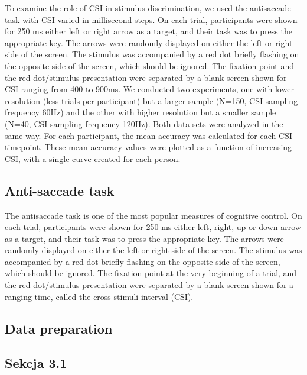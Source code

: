 \documentclass[
  man,draftall]{apa6}
\begin{document}
To examine the role of CSI in stimulus discrimination, we used the antisaccade
task with CSI varied in millisecond steps. On each trial, participants were shown for 250 ms
either left or right arrow as a target, and their task was to press the appropriate
key. The arrows were randomly displayed on either the left or right side of the
screen. The stimulus was accompanied by a red dot briefly flashing on the
opposite side of the screen, which should be ignored. The fixation point and
the red dot/stimulus presentation were separated by a blank screen shown for
CSI ranging from 400 to 900ms. We conducted two experiments, one with lower
resolution (less trials per participant) but a larger sample (N=150, CSI sampling
frequency 60Hz) and the other with higher resolution but a smaller sample
(N=40, CSI sampling frequency 120Hz). Both data sets were analyzed in the
same way. For each participant, the mean accuracy was calculated for each CSI
timepoint. These mean accuracy values were plotted as a function of increasing
CSI, with a single curve created for each person.

\hypertarget{anti-saccade-task}{%
\subsection{Anti-saccade task}\label{anti-saccade-task}}

The antisaccade task is one of the most popular measures of cognitive control.
On each trial, participants were shown for 250 ms either left, right,
up or down arrow as a target, and their task was to press the appropriate key.
The arrows were randomly displayed on either the left or right side of the screen.
The stimulus was accompanied by a red dot briefly flashing on the opposite side
of the screen, which should be ignored. The fixation point at the very beginning
of a trial, and the red dot/stimulus presentation were separated by a blank screen
shown for a ranging time, called the cross-stimuli interval (CSI).

\hypertarget{data-preparation}{%
\subsection{Data preparation}\label{data-preparation}}

\hypertarget{sekcja-3.1}{%
\subsection{Sekcja 3.1}\label{sekcja-3.1}}
\end{document}
